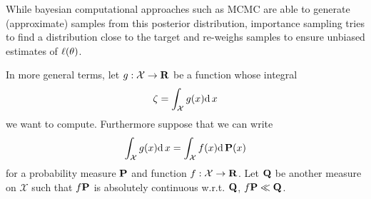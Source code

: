 While bayesian computational approaches such as MCMC are able to generate (approximate) samples from this posterior distribution, importance sampling tries to find a distribution close to the target and re-weighs samples to ensure unbiased estimates of $\lik(\theta)$.

In more general terms, let $g: \mathcal X \to \R$ be a function whose integral $$\zeta = \int_{\mathcal X} g(x) \d x$$ we want to compute. 
Furthermore suppose that we can write 
$$
    \int_{\mathcal X} g(x) \d x = \int_{\mathcal X} f(x) \d \P(x)
$$
for a probability measure $\P$ and function $f: \mathcal X \to \R$. 
Let $\Q$ be another measure on $\mathcal X$ such that $f\P$ is absolutely continuous w.r.t. $\Q$, $f\P \ll \Q$.